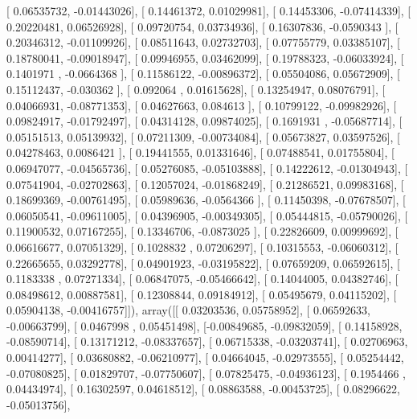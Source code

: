 \documentclass{article}
\begin{document}
       [ 0.06535732, -0.01443026],
       [ 0.14461372,  0.01029981],
       [ 0.14453306, -0.07414339],
       [ 0.20220481,  0.06526928],
       [ 0.09720754,  0.03734936],
       [ 0.16307836, -0.0590343 ],
       [ 0.20346312, -0.01109926],
       [ 0.08511643,  0.02732703],
       [ 0.07755779,  0.03385107],
       [ 0.18780041, -0.09018947],
       [ 0.09946955,  0.03462099],
       [ 0.19788323, -0.06033924],
       [ 0.1401971 , -0.0664368 ],
       [ 0.11586122, -0.00896372],
       [ 0.05504086,  0.05672909],
       [ 0.15112437, -0.030362  ],
       [ 0.092064  ,  0.01615628],
       [ 0.13254947,  0.08076791],
       [ 0.04066931, -0.08771353],
       [ 0.04627663,  0.084613  ],
       [ 0.10799122, -0.09982926],
       [ 0.09824917, -0.01792497],
       [ 0.04314128,  0.09874025],
       [ 0.1691931 , -0.05687714],
       [ 0.05151513,  0.05139932],
       [ 0.07211309, -0.00734084],
       [ 0.05673827,  0.03597526],
       [ 0.04278463,  0.0086421 ],
       [ 0.19441555,  0.01331646],
       [ 0.07488541,  0.01755804],
       [ 0.06947077, -0.04565736],
       [ 0.05276085, -0.05103888],
       [ 0.14222612, -0.01304943],
       [ 0.07541904, -0.02702863],
       [ 0.12057024, -0.01868249],
       [ 0.21286521,  0.09983168],
       [ 0.18699369, -0.00761495],
       [ 0.05989636, -0.0564366 ],
       [ 0.11450398, -0.07678507],
       [ 0.06050541, -0.09611005],
       [ 0.04396905, -0.00349305],
       [ 0.05444815, -0.05790026],
       [ 0.11900532,  0.07167255],
       [ 0.13346706, -0.0873025 ],
       [ 0.22826609,  0.00999692],
       [ 0.06616677,  0.07051329],
       [ 0.1028832 ,  0.07206297],
       [ 0.10315553, -0.06060312],
       [ 0.22665655,  0.03292778],
       [ 0.04901923, -0.03195822],
       [ 0.07659209,  0.06592615],
       [ 0.1183338 ,  0.07271334],
       [ 0.06847075, -0.05466642],
       [ 0.14044005,  0.04382746],
       [ 0.08498612,  0.00887581],
       [ 0.12308844,  0.09184912],
       [ 0.05495679,  0.04115202],
       [ 0.05904138, -0.00416757]]), array([[ 0.03203536,  0.05758952],
       [ 0.06592633, -0.00663799],
       [ 0.0467998 ,  0.05451498],
       [-0.00849685, -0.09832059],
       [ 0.14158928, -0.08590714],
       [ 0.13171212, -0.08337657],
       [ 0.06715338, -0.03203741],
       [ 0.02706963,  0.00414277],
       [ 0.03680882, -0.06210977],
       [ 0.04664045, -0.02973555],
       [ 0.05254442, -0.07080825],
       [ 0.01829707, -0.07750607],
       [ 0.07825475, -0.04936123],
       [ 0.1954466 ,  0.04434974],
       [ 0.16302597,  0.04618512],
       [ 0.08863588, -0.00453725],
       [ 0.08296622, -0.05013756],
\end{document}
